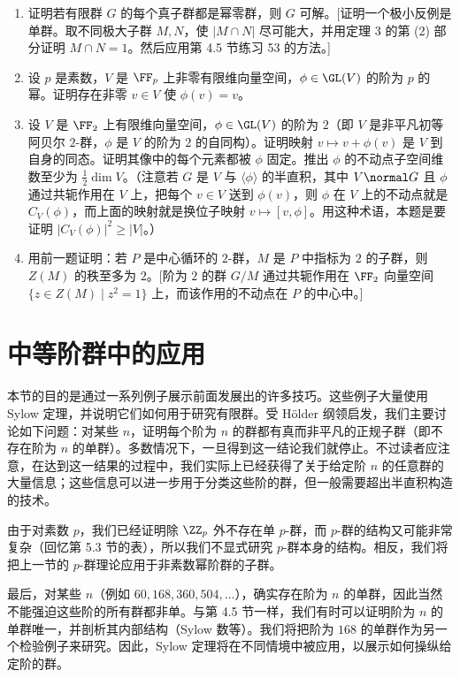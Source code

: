 \begin{enumerate}[label=\arabic*.,resume]
  \item 证明若有限群 $G$ 的每个真子群都是幂零群，则 $G$ 可解。[证明一个极小反例是单群。取不同极大子群 $M,N$，使 $|M\cap N|$ 尽可能大，并用定理 3 的第 (2) 部分证明 $M\cap N=1$。然后应用第 4.5 节练习 53 的方法。]
  \item 设 $p$ 是素数，$V$ 是 $\FF_p$ 上非零有限维向量空间，$\phi\in\GL(V)$ 的阶为 $p$ 的幂。证明存在非零 $v\in V$ 使 $\phi(v)=v$。
  \item 设 $V$ 是 $\FF_2$ 上有限维向量空间，$\phi\in\GL(V)$ 的阶为 $2$（即 $V$ 是非平凡初等阿贝尔 $2$-群，$\phi$ 是 $V$ 的阶为 $2$ 的自同构）。证明映射 $v\mapsto v+\phi(v)$ 是 $V$ 到自身的同态。证明其像中的每个元素都被 $\phi$ 固定。推出 $\phi$ 的不动点子空间维数至少为 $\frac12\dim V$。（注意若 $G$ 是 $V$ 与 $\langle\phi\rangle$ 的半直积，其中 $V\normal G$ 且 $\phi$ 通过共轭作用在 $V$ 上，把每个 $v\in V$ 送到 $\phi(v)$，则 $\phi$ 在 $V$ 上的不动点就是 $C_V(\phi)$，而上面的映射就是换位子映射 $v\mapsto [v,\phi]$。用这种术语，本题是要证明 $|C_V(\phi)|^2\geq |V|$。）
  \item 用前一题证明：若 $P$ 是中心循环的 $2$-群，$M$ 是 $P$ 中指标为 $2$ 的子群，则 $Z(M)$ 的秩至多为 $2$。[阶为 $2$ 的群 $G/M$ 通过共轭作用在 $\FF_2$ 向量空间 $\{z\in Z(M)\mid z^2=1\}$ 上，而该作用的不动点在 $P$ 的中心中。]
\end{enumerate}

\section{中等阶群中的应用}

本节的目的是通过一系列例子展示前面发展出的许多技巧。这些例子大量使用 Sylow 定理，并说明它们如何用于研究有限群。受 H\"older 纲领启发，我们主要讨论如下问题：对某些 $n$，证明每个阶为 $n$ 的群都有真而非平凡的正规子群（即不存在阶为 $n$ 的单群）。多数情况下，一旦得到这一结论我们就停止。不过读者应注意，在达到这一结果的过程中，我们实际上已经获得了关于给定阶 $n$ 的任意群的大量信息；这些信息可以进一步用于分类这些阶的群，但一般需要超出半直积构造的技术。

由于对素数 $p$，我们已经证明除 $\ZZ_p$ 外不存在单 $p$-群，而 $p$-群的结构又可能非常复杂（回忆第 5.3 节的表），所以我们不显式研究 $p$-群本身的结构。相反，我们将把上一节的 $p$-群理论应用于非素数幂阶群的子群。

最后，对某些 $n$（例如 $60,168,360,504,\ldots$），确实存在阶为 $n$ 的单群，因此当然不能强迫这些阶的所有群都非单。与第 4.5 节一样，我们有时可以证明阶为 $n$ 的单群唯一，并剖析其内部结构（Sylow 数等）。我们将把阶为 $168$ 的单群作为另一个检验例子来研究。因此，Sylow 定理将在不同情境中被应用，以展示如何操纵给定阶的群。

